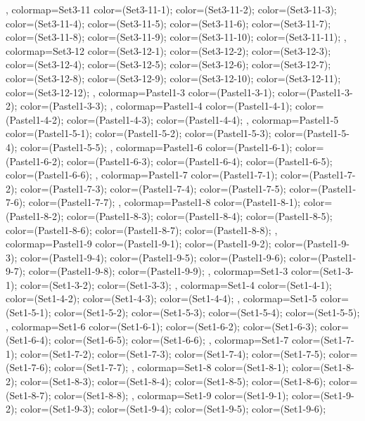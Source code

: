 {{},
colormap={Set3-11}{
  color=(Set3-11-1);
  color=(Set3-11-2);
  color=(Set3-11-3);
  color=(Set3-11-4);
  color=(Set3-11-5);
  color=(Set3-11-6);
  color=(Set3-11-7);
  color=(Set3-11-8);
  color=(Set3-11-9);
  color=(Set3-11-10);
  color=(Set3-11-11);
},
colormap={Set3-12}{
  color=(Set3-12-1);
  color=(Set3-12-2);
  color=(Set3-12-3);
  color=(Set3-12-4);
  color=(Set3-12-5);
  color=(Set3-12-6);
  color=(Set3-12-7);
  color=(Set3-12-8);
  color=(Set3-12-9);
  color=(Set3-12-10);
  color=(Set3-12-11);
  color=(Set3-12-12);
},
colormap={Pastel1-3}{
  color=(Pastel1-3-1);
  color=(Pastel1-3-2);
  color=(Pastel1-3-3);
},
colormap={Pastel1-4}{
  color=(Pastel1-4-1);
  color=(Pastel1-4-2);
  color=(Pastel1-4-3);
  color=(Pastel1-4-4);
},
colormap={Pastel1-5}{
  color=(Pastel1-5-1);
  color=(Pastel1-5-2);
  color=(Pastel1-5-3);
  color=(Pastel1-5-4);
  color=(Pastel1-5-5);
},
colormap={Pastel1-6}{
  color=(Pastel1-6-1);
  color=(Pastel1-6-2);
  color=(Pastel1-6-3);
  color=(Pastel1-6-4);
  color=(Pastel1-6-5);
  color=(Pastel1-6-6);
},
colormap={Pastel1-7}{
  color=(Pastel1-7-1);
  color=(Pastel1-7-2);
  color=(Pastel1-7-3);
  color=(Pastel1-7-4);
  color=(Pastel1-7-5);
  color=(Pastel1-7-6);
  color=(Pastel1-7-7);
},
colormap={Pastel1-8}{
  color=(Pastel1-8-1);
  color=(Pastel1-8-2);
  color=(Pastel1-8-3);
  color=(Pastel1-8-4);
  color=(Pastel1-8-5);
  color=(Pastel1-8-6);
  color=(Pastel1-8-7);
  color=(Pastel1-8-8);
},
colormap={Pastel1-9}{
  color=(Pastel1-9-1);
  color=(Pastel1-9-2);
  color=(Pastel1-9-3);
  color=(Pastel1-9-4);
  color=(Pastel1-9-5);
  color=(Pastel1-9-6);
  color=(Pastel1-9-7);
  color=(Pastel1-9-8);
  color=(Pastel1-9-9);
},
colormap={Set1-3}{
  color=(Set1-3-1);
  color=(Set1-3-2);
  color=(Set1-3-3);
},
colormap={Set1-4}{
  color=(Set1-4-1);
  color=(Set1-4-2);
  color=(Set1-4-3);
  color=(Set1-4-4);
},
colormap={Set1-5}{
  color=(Set1-5-1);
  color=(Set1-5-2);
  color=(Set1-5-3);
  color=(Set1-5-4);
  color=(Set1-5-5);
},
colormap={Set1-6}{
  color=(Set1-6-1);
  color=(Set1-6-2);
  color=(Set1-6-3);
  color=(Set1-6-4);
  color=(Set1-6-5);
  color=(Set1-6-6);
},
colormap={Set1-7}{
  color=(Set1-7-1);
  color=(Set1-7-2);
  color=(Set1-7-3);
  color=(Set1-7-4);
  color=(Set1-7-5);
  color=(Set1-7-6);
  color=(Set1-7-7);
},
colormap={Set1-8}{
  color=(Set1-8-1);
  color=(Set1-8-2);
  color=(Set1-8-3);
  color=(Set1-8-4);
  color=(Set1-8-5);
  color=(Set1-8-6);
  color=(Set1-8-7);
  color=(Set1-8-8);
},
colormap={Set1-9}{
  color=(Set1-9-1);
  color=(Set1-9-2);
  color=(Set1-9-3);
  color=(Set1-9-4);
  color=(Set1-9-5);
  color=(Set1-9-6);
}}
